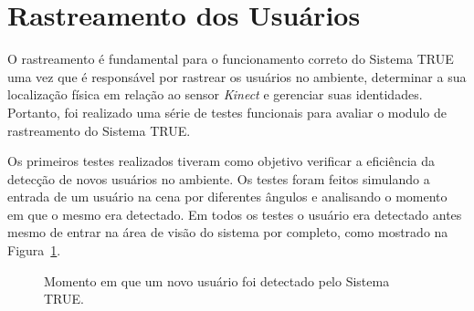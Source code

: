 \section{Rastreamento dos Usuários}

	O rastreamento é fundamental para o funcionamento correto do Sistema TRUE uma
	vez que é responsável por rastrear os usuários no ambiente, determinar a sua localização
	física em relação ao sensor \textit{Kinect} e gerenciar suas identidades.
	Portanto, foi realizado uma série de testes funcionais para avaliar o modulo de
	rastreamento do Sistema TRUE.
	
	Os primeiros testes realizados tiveram como objetivo verificar a eficiência da
	detecção de novos usuários no ambiente. Os testes foram feitos simulando a entrada de um
	usuário na cena por diferentes ângulos e analisando o momento em que o mesmo era
	detectado. Em todos os testes o usuário era detectado antes mesmo de entrar na
	área de visão do sistema por completo, como mostrado na
	Figura~\ref{fig:testes_deteccao}.
	
	\begin{figure}[htb]
		\begin{center}
		\end{center}
		\caption{Momento em que um novo usuário foi detectado pelo Sistema TRUE.}
		\label{fig:testes_deteccao}
	\end{figure}
		
